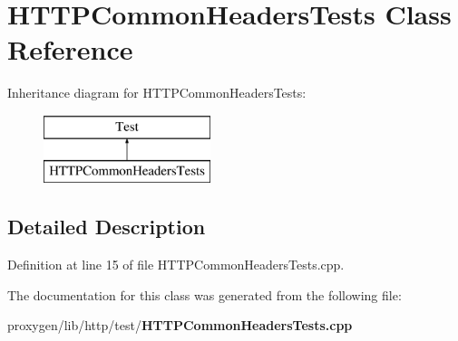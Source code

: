 \section{H\+T\+T\+P\+Common\+Headers\+Tests Class Reference}
\label{classHTTPCommonHeadersTests}
Inheritance diagram for H\+T\+T\+P\+Common\+Headers\+Tests\+:\begin{figure}[H]
\begin{center}
\leavevmode
\includegraphics[height=2.000000cm]{classHTTPCommonHeadersTests}
\end{center}
\end{figure}


\subsection{Detailed Description}


Definition at line 15 of file H\+T\+T\+P\+Common\+Headers\+Tests.\+cpp.



The documentation for this class was generated from the following file\+:\begin{DoxyCompactItemize}
\item 
proxygen/lib/http/test/{\bf H\+T\+T\+P\+Common\+Headers\+Tests.\+cpp}\end{DoxyCompactItemize}
